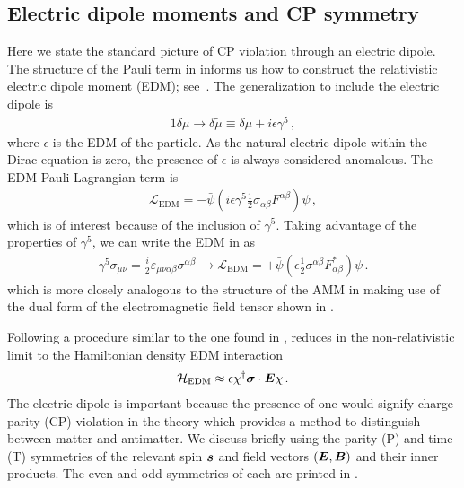 \subsection{Electric dipole moments and CP symmetry}
\label{sec:edm}
Here we state the standard picture of CP violation through an electric dipole. The structure of the Pauli term in  informs us how to construct the relativistic electric dipole moment (EDM); see~\cite{Knecht:2003kc,Jegerlehner:2017gek}. The generalization to include the electric dipole is
\begin{alignat}{1}
	\label{edm:1} \delta\mu\rightarrow\delta\tilde{\mu}\equiv\delta\mu+i\epsilon\gamma^{5}\,,
\end{alignat}
where $\epsilon$ is the EDM of the particle. As the natural electric dipole within the Dirac equation is zero, the presence of $\epsilon$ is always considered anomalous. The EDM Pauli Lagrangian term is
\begin{gather}
    \label{ledm:1}
    \mathcal{L}_\mathrm{EDM} = -{\bar\psi}\left(i\epsilon\gamma^{5}\frac{1}{2}\sigma_{\alpha\beta}F^{\alpha\beta}\right)\psi\,,
\end{gather}
which is of interest because of the inclusion of $\gamma^{5}$. Taking advantage of the properties of $\gamma^{5}$, we can write the EDM in  as
\begin{gather}
    \label{ledm:3}
    \gamma^{5}\sigma_{\mu\nu}=\frac{i}{2}\varepsilon_{\mu\nu\alpha\beta}\sigma^{\alpha\beta}\,\rightarrow
    \mathcal{L}_\mathrm{EDM} = +{\bar\psi}\left(\epsilon\frac{1}{2}\sigma^{\alpha\beta}F_{\alpha\beta}^{*}\right)\psi\,.
\end{gather}
which is more closely analogous to the structure of the AMM in  making use of the dual form of the electromagnetic field tensor shown in .

Following a procedure similar to the one found in ,  reduces in the non-relativistic limit to the Hamiltonian density EDM interaction
\begin{gather}
    \label{ledm:4}
    \mathcal{H}_\mathrm{EDM} \approx \epsilon\chi^{\dag}\boldsymbol{\sigma}\cdot\boldsymbol{E}\chi\,.
\end{gather}
The electric dipole is important because the presence of one would signify charge-parity (CP) violation in the theory which provides a method to distinguish between matter and antimatter. We discuss briefly using the parity (P) and time (T) symmetries of the relevant spin $\boldsymbol{s}$ and field vectors $(\boldsymbol{E},\boldsymbol{B})$ and their inner products. The even and odd symmetries of each are printed in .

